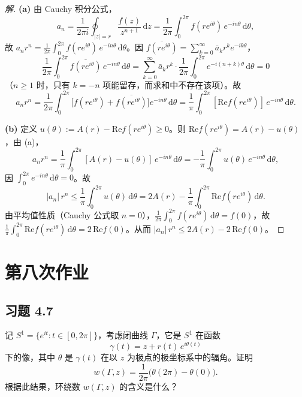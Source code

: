 \documentclass[11pt,a4paper]{article}
\renewcommand{\Re}{\mathrm{Re}}
\newcommand{\dd}{\mathrm{d}}
\theoremstyle{definition}
\newenvironment{solution}{\begin{proof}[解]}{\end{proof}}
\begin{document}
\begin{solution}
  \textbf{(a)}\;
  由 Cauchy 积分公式，
  \[
    a_n = \frac{1}{2\pi i}\oint_{|z|=r}
    \frac{f(z)}{z^{n+1}}\,\dd z
    = \frac{1}{2\pi}\int_0^{2\pi} f(re^{i\theta})\,e^{-in\theta}\,\dd\theta,
  \]
  故 $a_n r^n = \frac{1}{2\pi}\int_0^{2\pi} f(re^{i\theta})\,e^{-in\theta}\,\dd\theta$。因 $\overline{f(re^{i\theta})} = \sum_{k=0}^{\infty} \bar{a}_k r^k e^{-ik\theta}$，
  \[
    \frac{1}{2\pi}\int_0^{2\pi}
    \overline{f(re^{i\theta})}\,e^{-in\theta}\,\dd\theta
    = \sum_{k=0}^{\infty}\bar{a}_k r^k
    \cdot\frac{1}{2\pi}\int_0^{2\pi}e^{-i(n+k)\theta}\,\dd\theta = 0
  \]
  （$n \ge 1$ 时，只有 $k = -n$ 项能留存，而求和中不存在该项）。故
  \[
    a_n r^n
    = \frac{1}{2\pi}\int_0^{2\pi}
    \bigl[f(re^{i\theta})
    + \overline{f(re^{i\theta})}\bigr]e^{-in\theta}\,\dd\theta
    = \frac{1}{\pi}\int_0^{2\pi}
    [\Re f(re^{i\theta})]\,e^{-in\theta}\,\dd\theta.
  \]

  \medskip

  \textbf{(b)}\;
  定义 $u(\theta) := A(r) - \Re f(re^{i\theta}) \ge 0$。则 $\Re f(re^{i\theta}) = A(r) - u(\theta)$，由 (a)，
  \[
    a_n r^n
    = \frac{1}{\pi}\int_0^{2\pi}[A(r)-u(\theta)]\,e^{-in\theta}\,\dd\theta
    = -\frac{1}{\pi}\int_0^{2\pi}u(\theta)\,e^{-in\theta}\,\dd\theta,
  \]
  因 $\int_0^{2\pi}e^{-in\theta}\,\dd\theta = 0$。故
  \[
    |a_n|\,r^n
    \le \frac{1}{\pi}\int_0^{2\pi}u(\theta)\,\dd\theta
    = 2A(r) - \frac{1}{\pi}\int_0^{2\pi}\Re f(re^{i\theta})\,\dd\theta.
  \]
  由平均值性质（Cauchy 公式取 $n = 0$），$\frac{1}{2\pi}\int_0^{2\pi}f(re^{i\theta})\,\dd\theta = f(0)$，故 $\frac{1}{\pi}\int_0^{2\pi}\Re f(re^{i\theta})\,\dd\theta = 2\,\Re f(0)$。从而 $|a_n|\,r^n \le 2A(r) - 2\,\Re f(0)$。\qedhere
\end{solution}

\section{第八次作业}

\subsection{习题 4.7}

记 $S^1 = \{e^{it} : t \in [0, 2\pi]\}$，考虑闭曲线 $\Gamma$，它是 $S^1$ 在函数
\[
  \gamma(t) = z + r(t)\,e^{i\theta(t)}
\]
下的像，其中 $\theta$ 是 $\gamma(t)$ 在以 $z$ 为极点的极坐标系中的辐角。证明
\[
  w(\Gamma, z) = \frac{1}{2\pi}\bigl(\theta(2\pi) - \theta(0)\bigr).
\]
根据此结果，环绕数 $w(\Gamma, z)$ 的含义是什么？
\end{document}
